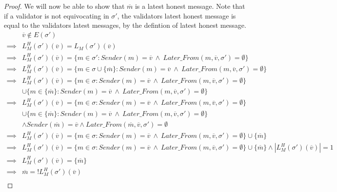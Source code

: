 \begin{proof}
We will now be able to show that $\overline{m}$ is a latest honest message. Note that if a validator is not equivocating in $\sigma'$, the validators latest honest message is equal to the validators latest messages, by the defintion of latest honest message.
\begin{align}
        &\overline{v} \notin E(\sigma') \\
\implies&L^H_M(\sigma')(\overline{v}) = L_M(\sigma')(\overline{v}) \\
\implies&L^H_M(\sigma')(\overline{v}) = \{m \in \sigma' : Sender(m) = \overline{v} ~\land~ Later\_From(m,\overline{v},\sigma') = \emptyset\} \\
\implies&L^H_M(\sigma')(\overline{v}) = \{m \in \sigma \cup \{\overline{m}\} : Sender(m) = \overline{v} ~\land~ Later\_From(m,\overline{v},\sigma') = \emptyset\} \\
\implies&L^H_M(\sigma')(\overline{v}) = \{m \in \sigma: Sender(m) = \overline{v} ~\land~ Later\_From(m,\overline{v},\sigma') = \emptyset\} \\
        &\cup \{m \in \{\overline{m}\}: Sender(m) = \overline{v} ~\land~ Later\_From(m,\overline{v},\sigma') = \emptyset\} \\
\implies&L^H_M(\sigma')(\overline{v}) = \{m \in \sigma: Sender(m) = \overline{v} ~\land~ Later\_From(m,\overline{v},\sigma') = \emptyset\} \\
        &\cup \{m \in \{\overline{m}\}: Sender(m) = \overline{v} ~\land~ Later\_From(m,\overline{v},\sigma') = \emptyset\} \\
        &\land Sender(\overline{m}) = \overline{v} \land Later\_From(\overline{m},\overline{v},\sigma') = \emptyset \\
\implies& L^H_M(\sigma')(\overline{v}) = \{m \in \sigma: Sender(m) = \overline{v} ~\land~ Later\_From(m,\overline{v},\sigma') = \emptyset\} \cup \{\overline{m}\} \\
\implies& L^H_M(\sigma')(\overline{v}) = \{m \in \sigma: Sender(m) = \overline{v} ~\land~ Later\_From(m,\overline{v},\sigma') = \emptyset\} \cup \{\overline{m}\} \land |L^H_M(\sigma')(\overline{v})| = 1 \\
\implies& L^H_M(\sigma')(\overline{v}) = \{\overline{m}\} \\
\implies& \overline{m} = !L^H_M(\sigma')(\overline{v}) \\
\end{align}
\end{proof}


